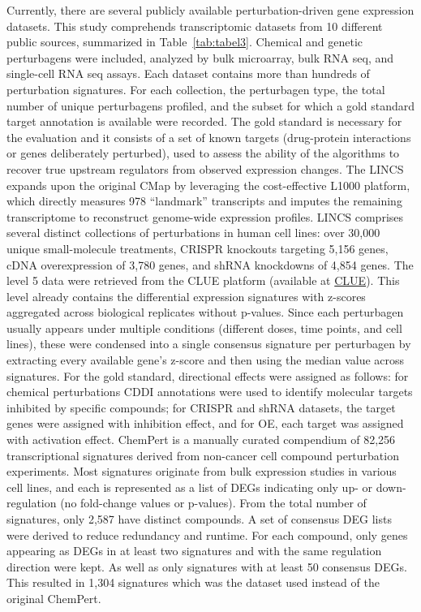 Currently, there are several publicly available perturbation-driven gene expression datasets. This study comprehends transcriptomic datasets from 10 different public sources, summarized in Table~\ref{tab:tabel3}. Chemical and genetic perturbagens were included, analyzed by bulk microarray, bulk RNA seq, and single-cell RNA seq assays. Each dataset contains more than hundreds of perturbation signatures. For each collection, the perturbagen type, the total number of unique perturbagens profiled, and the subset for which a gold standard target annotation is available were recorded. The gold standard is necessary for the evaluation and it consists of a set of known targets (drug-protein interactions or genes deliberately perturbed), used to assess the ability of the algorithms to recover true upstream regulators from observed expression changes. 
The LINCS expands upon the original CMap by leveraging the cost-effective L1000 platform, which directly measures 978 “landmark” transcripts and imputes the remaining transcriptome to reconstruct genome-wide expression profiles. LINCS comprises several distinct collections of perturbations in human cell lines: over 30,000 unique small-molecule treatments, CRISPR knockouts targeting 5,156 genes, cDNA overexpression of 3,780 genes, and shRNA knockdowns of 4,854 genes. The level 5 data were retrieved from the CLUE platform (available at \href{https://clue.io/data/CMap2020#LINCS2020}{CLUE}). This level already contains the differential expression signatures with z-scores aggregated across biological replicates without p-values. Since each perturbagen usually appears under multiple conditions (different doses, time points, and cell lines), these were condensed into a single consensus signature per perturbagen by extracting every available gene's z-score and then using the median value across signatures. For the gold standard, directional effects were assigned as follows: for chemical perturbations CDDI annotations were used to identify molecular targets inhibited by specific compounds; for CRISPR and shRNA datasets, the target genes were assigned with inhibition effect, and for OE, each target was assigned with activation effect.
ChemPert is a manually curated compendium of 82,256 transcriptional signatures derived from non-cancer cell compound perturbation experiments. Most signatures originate from bulk expression studies in various cell lines, and each is represented as a list of DEGs indicating only up- or down-regulation (no fold-change values or p-values). From the total number of signatures, only 2,587 have distinct compounds. A set of consensus DEG lists were derived to reduce redundancy and runtime. For each compound, only genes appearing as DEGs in at least two signatures and with the same regulation direction were kept. As well as only signatures with at least 50 consensus DEGs. This resulted in 1,304 signatures which was the dataset used instead of the original ChemPert.
